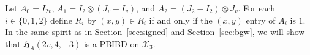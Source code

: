 \documentclass[11pt]{article}
\newtheorem{lemma}[theorem]{Lemma}
\begin{document}

Let $A_0=I_{2v}$, $A_1=I_2\otimes (J_v-I_v)$, and $A_2=(J_2-I_2)\otimes J_v$.
For each $i \in \{0,1,2\}$ define $R_i$ by $(x,y) \in R_i$ if and only if the $(x,y)$ entry of $A_i$ is $1$.
In the same spirit as in Section~\ref{sec:signed} and Section~\ref{sec:bgw}, we will show that $\mathfrak H_{A}(2v,4,-3)$ is a PBIBD on $\mathcal X_3$.
\end{document}
